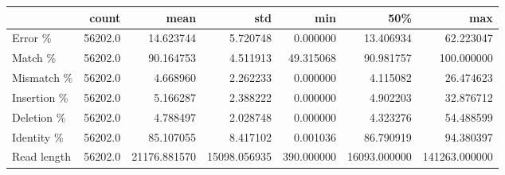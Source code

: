 \begin{tabular}{lrrrrrr}
\toprule
{} &    count &          mean &           std &         min &           50\% &            max \\
\midrule
Error \%     &  56202.0 &     14.623744 &      5.720748 &    0.000000 &     13.406934 &      62.223047 \\
Match \%     &  56202.0 &     90.164753 &      4.511913 &   49.315068 &     90.981757 &     100.000000 \\
Mismatch \%  &  56202.0 &      4.668960 &      2.262233 &    0.000000 &      4.115082 &      26.474623 \\
Insertion \% &  56202.0 &      5.166287 &      2.388222 &    0.000000 &      4.902203 &      32.876712 \\
Deletion \%  &  56202.0 &      4.788497 &      2.028748 &    0.000000 &      4.323276 &      54.488599 \\
Identity \%  &  56202.0 &     85.107055 &      8.417102 &    0.001036 &     86.790919 &      94.380397 \\
Read length &  56202.0 &  21176.881570 &  15098.056935 &  390.000000 &  16093.000000 &  141263.000000 \\
\bottomrule
\end{tabular}

